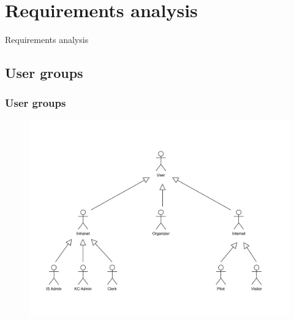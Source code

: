 \documentclass{beamer}
\begin{document}
\section{Requirements analysis}

\begin{frame}{Requirements analysis}

\end{frame}

\subsection{User groups}

\begin{frame}
\frametitle{User groups}
\begin{figure}
    \centering
    \includegraphics[width=0.8\linewidth]{drawio/users-uc.pdf}
\end{figure}
\end{frame}
\end{document}
